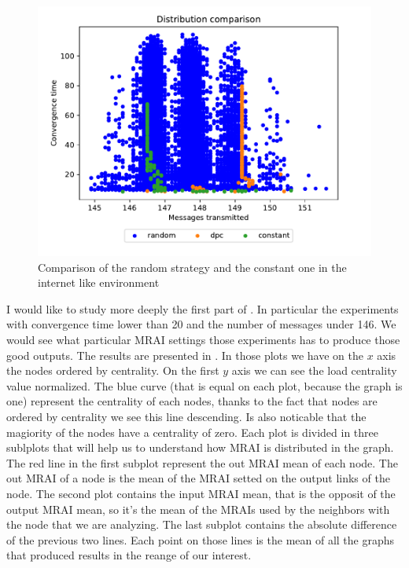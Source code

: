 \documentclass[10pt,conference,letterpaper]{IEEEtran}
\newcommand{\figwidth}{0.78}
\newcommand{\figvspace}{-1.5em}
\begin{document}
\begin{figure}[tb]
	\centering
	\includegraphics[width=\figwidth\columnwidth]{images/internet_like/internet_like_comparison}
	\caption{Comparison of the random strategy and the constant one in the internet like environment}
	\label{fig:internet_pareto_comparison}
	\vspace{\figvspace}
\end{figure}

I would like to study more deeply the first part of .
In particular the experiments with convergence time lower than \num{20} and the
number of messages under \num{146}.
We would see what particular \ac{MRAI} settings those experiments has to produce
those good outputs.
The results are presented in .
In those plots we have on the $x$ axis the nodes ordered by centrality.
On the first $y$ axis we can see the load centrality value normalized.
The blue curve (that is equal on each plot, because the graph is one) represent
the centrality of each nodes, thanks to the fact that nodes are ordered by centrality
we see this line descending.
Is also noticable that the magiority of the nodes have a centrality of zero.
Each plot is divided in three sublplots that will help us to understand how \ac{MRAI}
is distributed in the graph.
The red line in the first subplot represent the out \ac{MRAI} mean of each node.
The out \ac{MRAI} of a node is the mean of the \ac{MRAI} setted on the output
links of the node.
The second plot contains the input \ac{MRAI} mean, that is the opposit of the
output \ac{MRAI} mean, so it's the mean of the \ac{MRAI}s used by the neighbors
with the node that we are analyzing.
The last subplot contains the absolute difference of the previous two lines.
Each point on those lines is the mean of all the graphs that produced results
in the reange of our interest.
\end{document}
